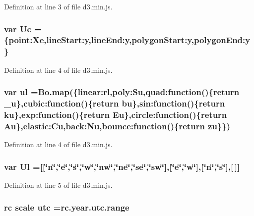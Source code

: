 Definition at line 3 of file d3.\+min.\+js.

\subsubsection[{Uc}]{\setlength{\rightskip}{0pt plus 5cm}var Uc =\{point\+:\+Xe,line\+Start\+:y,line\+End\+:y,polygon\+Start\+:y,polygon\+End\+:y\}}\label{d3_8min_8js_a2217e0458029fc4b21a79c43f70bb395}


Definition at line 4 of file d3.\+min.\+js.

\subsubsection[{ul}]{\setlength{\rightskip}{0pt plus 5cm}var ul ={\bf Bo.\+map}(\{linear\+:rl,poly\+:\+Su,quad\+:function()\{{\bf return} {\bf \+\_\+u}\},cubic\+:function()\{{\bf return} {\bf bu}\},sin\+:function()\{{\bf return} {\bf ku}\},exp\+:function()\{{\bf return} {\bf Eu}\},circle\+:function()\{{\bf return} {\bf Au}\},elastic\+:\+Cu,back\+:\+Nu,bounce\+:function()\{{\bf return} {\bf zu}\}\})}\label{d3_8min_8js_abccff9b27b864535f911e2b3ca47afba}


Definition at line 4 of file d3.\+min.\+js.

\subsubsection[{Ul}]{\setlength{\rightskip}{0pt plus 5cm}var Ul =[[\char`\"{}n\char`\"{},\char`\"{}{\bf e}\char`\"{},\char`\"{}s\char`\"{},\char`\"{}w\char`\"{},\char`\"{}nw\char`\"{},\char`\"{}ne\char`\"{},\char`\"{}se\char`\"{},\char`\"{}sw\char`\"{}],[\char`\"{}{\bf e}\char`\"{},\char`\"{}w\char`\"{}],[\char`\"{}{\bf n}\char`\"{},\char`\"{}s\char`\"{}],[$\,$]]}\label{d3_8min_8js_a8285fd729e0c20dca87e61aa79c1d002}


Definition at line 5 of file d3.\+min.\+js.

\subsubsection[{utc}]{ {\bf rc} {\bf scale} utc ={\bf rc.\+year.\+utc.\+range}}\label{d3_8min_8js_acc5917e18c3ffbb3072623ac907f0a82}


